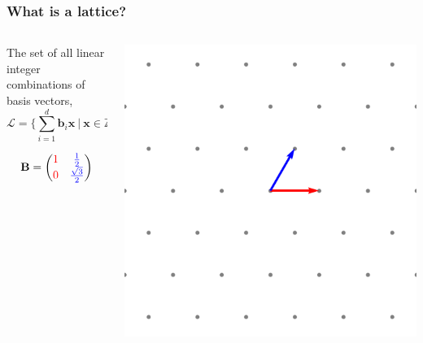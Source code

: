 \documentclass[
aspectratio=169, %
t, %
onlytextwidth, %
10pt, %
]{beamer}
\begin{document}
\begin{frame}
    \frametitle{What is a lattice?}
    \begin{columns}[T]
        \begin{column}{0.48\linewidth}
            \begin{center}
            \begin{tcolorbox}[colback=ICLBlue!5!white,colframe=ICLBlue,title=\textbf{Definition:} Lattice]
                The set of all linear integer combinations of basis vectors,
                \[
                    \mathcal{L} = \{ \sum_{i = 1}^{d}\mathbf{b}_i\mathbf{x} \ | \ \mathbf{x} \in \mathbb{Z}^d \}
                \]
            \end{tcolorbox}

            \[
                \mathbf{B} = \begin{pmatrix}
                    \color{red}1 & \color{blue}\frac{1}{2}\\
                    \color{red}0 & \color{blue}\frac{\sqrt{3}}{2}
                \end{pmatrix}
            \]
            \end{center}
        \end{column}
        \begin{column}{0.48\linewidth}
            \includegraphics[width=\linewidth]{a2_good_basis.png}
        \end{column}
    \end{columns}
\end{frame}
\end{document}
